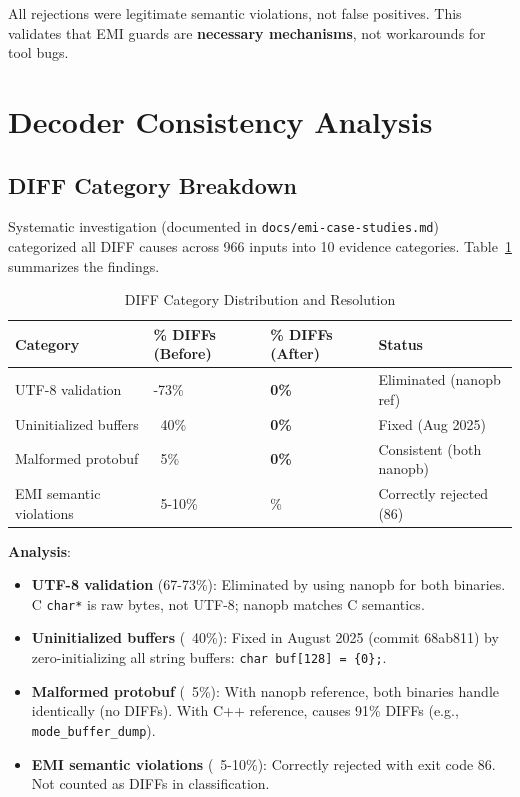 \documentclass[doublespace,nopageskip]{VTthesis}
\begin{document}
All rejections were legitimate semantic violations, not false positives. This validates that EMI guards are \textbf{necessary mechanisms}, not workarounds for tool bugs.

\section{Decoder Consistency Analysis} \label{se:decoder_consistency}

\subsection{DIFF Category Breakdown}

Systematic investigation (documented in \texttt{docs/emi-case-studies.md}) categorized all DIFF causes across 966 inputs into 10 evidence categories. Table~\ref{tab:diff_category_breakdown} summarizes the findings.

\begin{table}[htb]
    \centering
    \caption{DIFF Category Distribution and Resolution}
    \begin{tabularx}{\textwidth}{>{\raggedright\arraybackslash}p{3.5cm} >{\centering\arraybackslash}p{1.8cm} >{\centering\arraybackslash}p{1.8cm} >{\centering\arraybackslash}X}
        \toprule
        Category & \% DIFFs (Before) & \% DIFFs (After) & Status \\
        \midrule
        UTF-8 validation & 67-73\% & \textbf{0\%} & Eliminated (nanopb ref) \\
        Uninitialized buffers & ~40\% & \textbf{0\%} & Fixed (Aug 2025) \\
        Malformed protobuf & ~5\% & \textbf{0\%} & Consistent (both nanopb) \\
        EMI semantic violations & ~5-10\% & 6.1\% & Correctly rejected (86) \\
        \bottomrule
    \end{tabularx}
    \label{tab:diff_category_breakdown}
\end{table}

\textbf{Analysis}:
\begin{itemize}
    \item \textbf{UTF-8 validation} (67-73\%): Eliminated by using nanopb for both binaries. C \texttt{char*} is raw bytes, not UTF-8; nanopb matches C semantics.
    \item \textbf{Uninitialized buffers} (~40\%): Fixed in August 2025 (commit 68ab811) by zero-initializing all string buffers: \texttt{char buf[128] = \{0\};}.
    \item \textbf{Malformed protobuf} (~5\%): With nanopb reference, both binaries handle identically (no DIFFs). With C++ reference, causes 91\% DIFFs (e.g., \texttt{mode\_buffer\_dump}).
    \item \textbf{EMI semantic violations} (~5-10\%): Correctly rejected with exit code 86. Not counted as DIFFs in classification.
\end{itemize}
\end{document}
